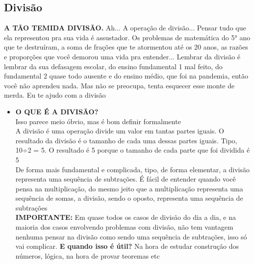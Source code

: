 \documentclass{article}
\begin{document}
\subsection{Divisão}
\textbf{A TÃO TEMIDA DIVISÃO.} Ah... A operação de divisão... Pensar tudo que ela representou pra sua vida é assustador. Os problemas de matemática do 5° ano que te destruíram, a soma de frações que te atormentou até os 20 anos, as razões e proporções que você demorou uma vida pra entender... Lembrar da divisão é lembrar da sua defasagem escolar, do ensino fundamental 1 mal feito, do fundamental 2 quase todo ausente e do ensino médio, que foi na pandemia, então você não aprendeu nada. Mas não se preocupa, tenta esquecer esse monte de merda. Eu te ajudo com a divisão
\begin{itemize}
    \item \textbf{O QUE É A DIVISÃO?}\\[5pt] Isso parece meio óbvio, mas é bom definir formalmente
    \\[5pt]
    A divisão é uma operação divide um valor em tantas partes iguais. O resultado da divisão é o tamanho de cada uma dessas partes iguais. Tipo, 10÷2 = 5. O resultado é 5 porque o tamanho de cada parte que foi dividida é 5
    \\[5pt]
    De forma mais fundamental e complicada, tipo, de forma elementar, a divisão representa uma sequência de subtrações. É fácil de entender quando você pensa na multiplicação, do mesmo jeito que a multiplicação representa uma sequência de somas, a divisão, sendo o oposto, representa uma sequência de subtrações
    \\[5pt]
    \textbf{IMPORTANTE:} Em quase todos os casos de divisão do dia a dia, e na maioria dos casos envolvendo problemas com divisão, não tem vantagem nenhuma pensar na divisão como sendo uma sequência de subtrações, isso só vai complicar. \textbf{E quando isso é útil?} Na hora de estudar construção dos números, lógica, na hora de provar teoremas etc


\end{itemize}
\end{document}
